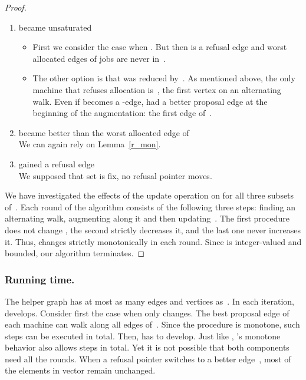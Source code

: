 \documentclass{llncs}
\begin{document}
\begin{proof}
\begin{enumerate}
	\item  became unsaturated
		\begin{itemize}
 			\item First we consider the case when . But then  is a refusal edge and worst allocated edges of jobs are never in~.
			\item The other option is that  was reduced by~. As mentioned above, the only machine that refuses allocation is~, the first vertex on an alternating walk. Even if  becomes a -edge,  had a better proposal edge at the beginning of the augmentation: the first edge of~.
		\end{itemize}
	\item  became better than the worst allocated edge of \\ We can again rely on Lemma~\ref{r_mon}.
 	\item  gained a refusal edge \\ We supposed that set  is fix, no refusal pointer moves.
\end{enumerate}

We have investigated the effects of the update operation on  for all three subsets of~. Each round of the algorithm consists of the following three steps: finding an alternating walk, augmenting along it and then updating~. The first procedure does not change , the second strictly decreases it, and the last one never increases it. Thus,  changes strictly monotonically in each round. Since  is integer-valued and bounded, our algorithm terminates.
\end{proof}

\subsubsection*{Running time.}

The helper graph  has at most as many edges and vertices as~. In each iteration,  develops. Consider first the case when only  changes. The best proposal edge of each machine  can walk along all  edges of~. Since the procedure is monotone,  such steps can be executed in total. Then,  has to develop. Just like , 's monotone behavior also allows  steps in total. Yet it is not possible that both components need all the  rounds. When a refusal pointer  switches to a better edge~, most of the elements in vector  remain unchanged.
\end{document}
